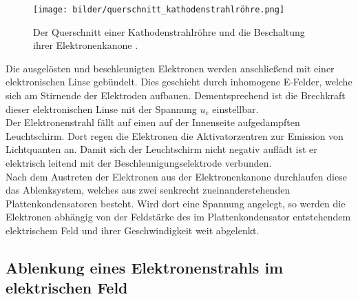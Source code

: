     \begin{figure}[H]
        \centering
        \texttt{[image: bilder/querschnitt\_kathodenstrahlröhre.png]}
        \caption{Der Querschnitt einer Kathodenstrahlröhre und die Beschaltung ihrer Elektronenkanone \cite{anleitung501}.}
        \label{fig:querschnitt_kathodenstrahlroehre}
    \end{figure}

    \noindent Die ausgelösten und beschleunigten Elektronen werden anschließend mit einer elektronischen Linse gebündelt. Dies geschieht durch inhomogene E-Felder, 
    welche sich am Stirnende der Elektroden aufbauen. Dementsprechend ist die Brechkraft dieser elektronischen Linse mit der Spannung $u_{\text{c}}$ einstellbar.\\
    Der Elektronenstrahl fällt auf einen auf der Innenseite aufgedampften Leuchtschirm. Dort regen die Elektronen die Aktivatorzentren zur Emission von
    Lichtquanten an. Damit sich der Leuchtschirm nicht negativ auflädt ist er elektrisch leitend mit der Beschleunigungselektrode verbunden. \\
    Nach dem Austreten der Elektronen aus der Elektronenkanone durchlaufen diese das Ablenksystem, welches aus zwei senkrecht zueinanderstehenden
    Plattenkondensatoren besteht. Wird dort eine Spannung angelegt, so werden die Elektronen abhängig von der Feldstärke des im Plattenkondensator entstehendem 
    elektrischem Feld und ihrer Geschwindigkeit weit abgelenkt. 

\subsection{Ablenkung eines Elektronenstrahls im elektrischen Feld}

